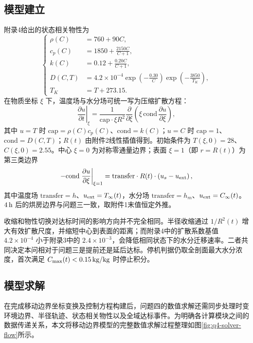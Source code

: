 \documentclass[UTF8,a4paper,12pt]{ctexart}
\begin{document}
\subsection{模型建立}
附录4给出的状态相关物性为
\begin{equation}
\left\{
\begin{aligned}
\rho(C)&=760+90C,\\
c_p(C)&=1850+\frac{2150C}{C+1},\\
k(C)&=0.12+\frac{0.20C}{C+1},\\
D(C,T)&=4.2\times10^{-4}
\exp\left(-\frac{0.30}{C}\right)
\exp\left(-\frac{3850}{T_K}\right),\\
T_K&=T+273.15.
\end{aligned}
\right.
\end{equation}
\setcounter{equation}{41}
在物质坐标 $\xi$ 下，温度场与水分场可统一写为压缩扩散方程：
\begin{equation}
  \left.\frac{\partial u}{\partial t}\right|_{\xi}
  =\frac{1}{\mathrm{cap}\cdot\xi R^2}
  \frac{\partial}{\partial\xi}\left(\xi\,\mathrm{cond}\,\frac{\partial u}{\partial\xi}\right),
\end{equation}
其中 $u=T$ 时 $\mathrm{cap}=\rho(C)c_p(C)$、$\mathrm{cond}=k(C)$；$u=C$ 时 $\mathrm{cap}=1$、$\mathrm{cond}=D(C,T)$；$R(t)$ 由附件2线性插值得到。初始条件为 $T(\xi,0)=28$、$C(\xi,0)=2.55$。中心 $\xi=0$ 为对称零通量边界；表面 $\xi=1$（即 $r=R(t)$）为第三类边界
\begin{equation}
  -\mathrm{cond}\left.\frac{\partial u}{\partial\xi}\right|_{\xi=1}
  =\mathrm{transfer}\cdot R(t)\cdot\left(u_s-u_{\rm ext}\right),
\end{equation}
其中温度场 $\mathrm{transfer}=h$、$u_{\rm ext}=T_\infty(t)$，水分场 $\mathrm{transfer}=h_m$、$u_{\rm ext}=C_\infty(t)$。$4\rm\,h$ 后的烘房边界与问题三一致，取附件1末值恒定外推。

收缩和物性切换对达标时间的影响方向并不完全相同。半径收缩通过 $1/R^2(t)$ 增大有效扩散尺度，并缩短中心到表面的距离；而附录4中的扩散系数基值 $4.2\times10^{-4}$ 小于附录3中的 $2.4\times10^{-3}$，会降低相同状态下的水分迁移速率。二者共同决定本问相对于问题三是提前还是延后达标。停机判据仍取全剖面最大水分浓度，首次满足 $C_{\max}(t)<0.15\rm\,kg/kg$ 时停止积分。

\subsection{模型求解}
在完成移动边界坐标变换及控制方程构建后，问题四的数值求解还需同步处理时变环境边界、半径轨迹、状态相关物性以及全域达标事件。为明确各计算模块之间的数据传递关系，本文将移动边界模型的完整数值求解过程整理如图\ref{fig:q4-solver-flow}所示。
\end{document}
